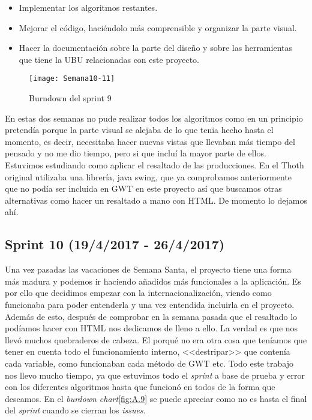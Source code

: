 \begin{itemize}
\item Implementar los algoritmos restantes.
\item Mejorar el código, haciéndolo más comprensible y organizar la parte visual.
\item Hacer la documentación sobre la parte del diseño y sobre las herramientas que tiene la UBU relacionadas con este proyecto.
\end{itemize}

\begin{figure}[h]
\centering
\texttt{[image: Semana10-11]}
\caption{Burndown del sprint 9}
\label{fig:A.8}
\end{figure}

En estas dos semanas no pude realizar todos los algoritmos como en un principio pretendía porque la parte visual se alejaba de lo que tenia hecho hasta el momento, es decir, necesitaba hacer nuevas vistas que llevaban más tiempo del pensado y no me dio tiempo, pero si que incluí la mayor parte de ellos. Estuvimos estudiando como aplicar el resaltado de las producciones. En el Thoth original utilizaba una librería, java swing, que ya comprobamos anteriormente que no podía ser incluida en GWT en este proyecto así que buscamos otras alternativas como hacer un resaltado a mano con HTML. De momento lo dejamos ahí.

\subsection{Sprint 10 (19/4/2017 - 26/4/2017)}

Una vez pasadas las vacaciones de Semana Santa, el proyecto tiene una forma más madura y podemos ir haciendo añadidos más funcionales a la aplicación. Es por ello que decidimos empezar con la internacionalización, viendo como funcionaba para poder entenderla y una vez entendida incluirla en el proyecto. Además de esto, después de comprobar en la semana pasada que el resaltado lo podíamos hacer con HTML nos dedicamos de lleno a ello. La verdad es que nos llevó muchos quebraderos de cabeza. El porqué no era otra cosa que teníamos que tener en cuenta todo el funcionamiento interno, <<destripar>> que contenía cada variable, como funcionaban cada método de GWT etc. Todo este trabajo nos llevo mucho tiempo, ya que estuvimos todo el \emph{sprint} a base de prueba y error con los diferentes algoritmos hasta que funcionó en todos de la forma que deseamos. En el \emph{burdown chart}\ref{fig:A.9} se puede apreciar como no es hasta el final del \emph{sprint} cuando se cierran los \emph{issues}.

